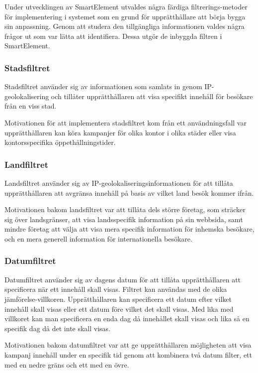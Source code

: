 Under utvecklingen av SmartElement utvaldes några färdiga filtrerings-metoder för implementering i systemet som en grund för upprätthållare att börja bygga sin anpassning. Genom att studera den tillgängliga informationen valdes några frågor ut som var lätta att identifiera. Dessa utgör de inbyggda filtren i SmartElement.

\subsubsection{Stadsfiltret}

Stadsfiltret använder sig av informationen som samlats in genom IP-geolokalisering och tillåter upprätthållaren att visa specifikt innehåll för besökare från en viss stad.

Motivationen för att implementera stadsfiltret kom från ett användningsfall var upprätthållaren kan köra kampanjer för olika kontor i olika städer eller visa kontorsspecifika öppethållningstider.

\subsubsection{Landfiltret}

Landsfiltret använder sig av IP-geolokaliseringsinformationen för att tillåta upprätthållaren att avgränsa innehåll på basis av vilket land besök kommer ifrån.

Motivationen bakom landsfiltret var att tillåta dels större företag, som sträcker sig över landsgränser, att visa landsspecifik information på sin webbsida, samt mindre företag att välja att visa mera specifik information för inhemska besökare, och en mera generell information för internationella besökare.

\subsubsection{Datumfiltret}

Datumfiltret använder sig av dagens datum för att tillåta upprätthållaren att specificera när ett innehåll skall visas. Filtret kan användas med de olika jämförelse-villkoren. Upprätthållaren kan specificera ett datum efter vilket innehåll skall visas eller ett datum före vilket det skall visas. Med lika med villkoret kan man specificera en enda dag då innehållet skall visas och lika så en specifik dag då det inte skall visas.

Motivationen bakom datumfiltret var att ge upprätthållaren möjligheten att visa kampanj innehåll under en specifik tid genom att kombinera två datum filter, ett med en nedre gräns och ett med en övre.

